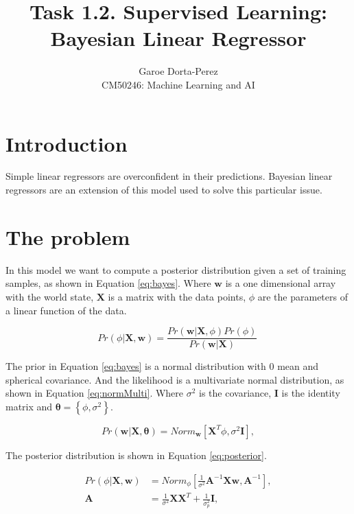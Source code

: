 \documentclass[12pt]{article}
\begin{document}
  
\title{Task 1.2. Supervised Learning: Bayesian Linear Regressor}
\author{Garoe Dorta-Perez\\
CM50246: Machine Learning and AI}
 
\maketitle
 
\section{Introduction}

Simple linear regressors are overconfident in their predictions.
Bayesian linear regressors are an extension of this model used to solve this particular issue.

\section{The problem}

In this model we want to compute a posterior distribution given a set of training samples, as shown in Equation \ref{eq:bayes}. 
Where $\mathbf{w}$ is a one dimensional array with the world state, $\mathbf{X}$ is a matrix with the data points, $\phi$ are the parameters of a linear function of the data.

\begin{equation}
\label{eq:bayes}
Pr(\phi | \mathbf{X}, \mathbf{w} ) = \frac{ Pr(\mathbf{w} | \mathbf{X}, \phi) Pr(\phi)} {Pr(\mathbf{w} | \mathbf{X} )}\,
\end{equation}

The prior in Equation \ref{eq:bayes} is a normal distribution with 0 mean and spherical covariance.
And the likelihood is a multivariate normal distribution, as shown in Equation \ref{eq:normMulti}.
Where  $\sigma^2$ is the covariance, $\mathbf{I}$ is the identity matrix and $\boldsymbol{\theta}= \left\{ \phi, \sigma^2 \right\}$.

\begin{equation}
\label{eq:normMulti}
Pr(\mathbf{w} | \mathbf{X}, \boldsymbol{\theta} ) = Norm_{\mathbf{w}}\left[ \mathbf{X}^T \phi, \sigma^2 \mathbf{I} \right],
\end{equation}

The posterior distribution is shown in Equation \ref{eq:posterior}.

\begin{equation}
\begin{split}
\label{eq:posterior}
Pr(\phi | \mathbf{X}, \mathbf{w} ) &= Norm_{\phi}\left[ \frac{1}{\sigma^2} \mathbf{A}^{-1} \mathbf{X} \mathbf{w}, \mathbf{A}^{-1} \right],\\
\mathbf{A} &= \frac{1}{\sigma^2} \mathbf{X} \mathbf{X}^T + \frac{1}{\sigma^2_p} \mathbf{I},
\end{split}
\end{equation}
\end{document}
